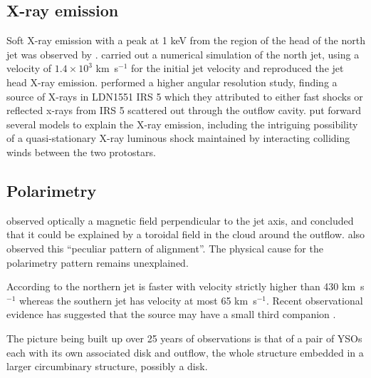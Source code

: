 \subsection{X-ray emission}
Soft X-ray emission with a peak at 1 keV from the region of the head of the north jet was observed by \citet{2002A&A...386..204F}.
\citet{2004A&A...424L...1B} carried out a numerical simulation of the north jet,
using a velocity of $1.4\times10^{3}$ km~s$^{-1}$ for the initial jet velocity
and reproduced the jet head X-ray emission.
\citet{2003ApJ...584..843B} performed a higher angular resolution study, finding
a source of X-rays in LDN1551 IRS 5 which they attributed to either fast shocks or
reflected x-rays from IRS 5 scattered out through the outflow cavity.
\citet{2003ApJ...584..843B} put forward several models to explain the X-ray
emission, including the intriguing possibility of a quasi-stationary X-ray
luminous shock maintained by interacting colliding winds between the two protostars.

\subsection{Polarimetry}
\citet{1988MNRAS.231P..39S} observed optically a magnetic field perpendicular to
the jet axis, and concluded that it could be explained by a
toroidal field in the cloud around the outflow.
\citet{1997MNRAS.286..895L} also observed this ``peculiar pattern of
alignment''. The physical cause for the polarimetry pattern remains unexplained.

According to \citet{2005ApJ...L} the northern jet is faster with velocity strictly higher than 430 km~s$^{-1}$ whereas the southern jet has velocity at most 65 km~s$^{-1}$.
Recent observational evidence has suggested that the source may have a small
third companion \citep{2005JKAS...38..237L}.


The picture being built up over 25 years of observations is that of a pair of YSOs each with its own associated disk and outflow, the whole structure embedded in a larger circumbinary structure, possibly a disk.





